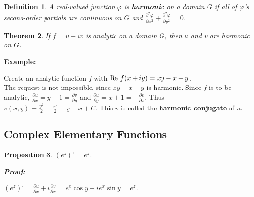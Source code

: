 \documentclass{article}
\theoremstyle{colontheorem}
\newtheorem{theorem}{Theorem}[section]
\newtheorem{proposition}[theorem]{Proposition}
\newtheorem{definition}[theorem]{Definition}
\newcommand{\re}{\textnormal{Re }}
\newenvironment{Theorem}
{
	\begin{mdframed}[backgroundcolor=TheoremOrange!10]
	\begin{theorem}
}
{
	\end{theorem}
	\end{mdframed}
	
	\vspace{.15in}
}
\newenvironment{Proposition}
{
	\begin{mdframed}[backgroundcolor=TheoremOrange!10]
	\begin{proposition}
}
{
	\end{proposition}
	\end{mdframed}
	
	\vspace{.15in}
}
\newenvironment{Def}
{
	\begin{mdframed}[backgroundcolor=DefGreen!10]
	\begin{definition}
}
{
	\end{definition}
	\end{mdframed}
	
	\vspace{.15in}
}
\newenvironment{Proof}
{
	\begin{mdframed}[backgroundcolor=ProofPurple!10]
	\textbf{Proof:}%
}
{
	\end{mdframed}
	
	\vspace{.085in}
}
\newenvironment{Example}
{
	\begin{mdframed}
	\textbf{Example:}%
}
{
	\end{mdframed}
	
	\vspace{.15in}
}
\begin{document}
\begin{Def}
	
	A real-valued function $\varphi$ is \textbf{harmonic} on a domain $G$ if all of $\varphi$'s second-order partials are continuous on $G$ and $\frac{\partial^2 \varphi}{\partial x^2} + \frac{\partial^2 \varphi}{\partial y^2} = 0$.
	
\end{Def}



\begin{Theorem}
	
	If $f = u+iv$ is analytic on a domain $G$, then $u$ and $v$ are harmonic on $G$.
	
\end{Theorem}



\begin{Example}
	Create an analytic function $f$ with $\re f(x + iy) = xy - x + y$.\\
	
	The request is not impossible, since $xy - x + y$ is harmonic. Since $f$ is to be analytic, $\frac{\partial u}{\partial x} = y - 1 = \frac{\partial v}{\partial y}$ and $\frac{\partial u}{\partial y} = x + 1 = -\frac{\partial v}{\partial x}$. Thus $v(x, y) = \frac{y^2}{2} - \frac{x^2}{2} - y - x + C$. This $v$ is called the \textbf{harmonic conjugate} of $u$. 
	
\end{Example}





\begin{center}
	\pagebreak
	
	\section{Complex Elementary Functions}
	
	\vspace{.1in}
\end{center}



\begin{Proposition}
	
	$(e^z)' = e^z$.
	
	\begin{Proof}
		$(e^z)' = \frac{\partial u}{\partial x} + i \frac{\partial v}{\partial x} = e^x \cos y + i e^x \sin y = e^z$.
		
	\end{Proof}
	
\end{Proposition}
\end{document}
